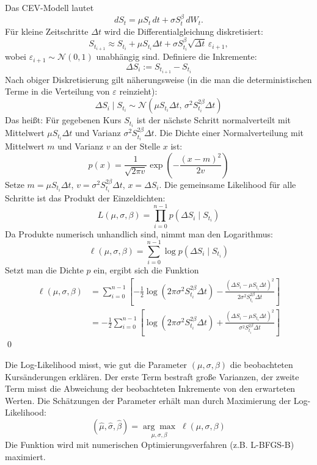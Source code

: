 \begin{satz}
Das CEV-Modell lautet
$$
dS_t = \mu S_t\,dt + \sigma S_t^{\beta}\,dW_t.
$$
Für kleine Zeitschritte $\Delta t$ wird die Differentialgleichung diskretisiert:
$$
S_{t_{i+1}} \approx S_{t_i} + \mu S_{t_i} \Delta t + \sigma S_{t_i}^{\beta} \sqrt{\Delta t}\, \varepsilon_{i+1},
$$
wobei $\varepsilon_{i+1} \sim \mathcal N(0,1)$ unabhängig sind.
Definiere die Inkremente:
$$
\Delta S_i := S_{t_{i+1}} - S_{t_i}
$$
Nach obiger Diskretisierung gilt näherungsweise (in die man die deterministischen Terme in die Verteilung von $\varepsilon$ reinzieht):
$$
\Delta S_i \mid S_{t_i} \sim \mathcal N\left(\mu S_{t_i} \Delta t,\, \sigma^2 S_{t_i}^{2\beta} \Delta t\right)
$$
Das heißt: Für gegebenen Kurs $S_{t_i}$ ist der nächste Schritt normalverteilt mit 
Mittelwert $\mu S_{t_i} \Delta t$ und Varianz $\sigma^2 S_{t_i}^{2\beta} \Delta t$.
Die Dichte einer Normalverteilung mit Mittelwert $m$ und Varianz $v$ an der Stelle $x$ ist:
$$
p(x) = \frac{1}{\sqrt{2\pi v}} \exp\left(-\frac{(x-m)^2}{2v}\right)
$$
Setze $m = \mu S_{t_i} \Delta t$, $v = \sigma^2 S_{t_i}^{2\beta} \Delta t$, $x = \Delta S_i$.
Die gemeinsame Likelihood für alle Schritte ist das Produkt der Einzeldichten:
$$
L(\mu, \sigma, \beta) = \prod_{i=0}^{n-1} p(\Delta S_i \mid S_{t_i})
$$
Da Produkte numerisch unhandlich sind, nimmt man den Logarithmus:
$$
\ell(\mu, \sigma, \beta) = \sum_{i=0}^{n-1} \log p(\Delta S_i \mid S_{t_i})
$$
Setzt man die Dichte $p$ ein, ergibt sich die Funktion
\begin{align*}
\ell(\mu, \sigma, \beta) &= \sum_{i=0}^{n-1} \left[
    -\frac{1}{2} \log(2\pi \sigma^2 S_{t_i}^{2\beta} \Delta t)
    -\frac{(\Delta S_i - \mu S_{t_i} \Delta t)^2}{2 \sigma^2 S_{t_i}^{2\beta} \Delta t}
\right] \\
&= -\frac{1}{2} \sum_{i=0}^{n-1} \left[
    \log(2\pi \sigma^2 S_{t_i}^{2\beta} \Delta t)
    + \frac{(\Delta S_i - \mu S_{t_i} \Delta t)^2}{\sigma^2 S_{t_i}^{2\beta} \Delta t}
\right]
\end{align*} 
\qed
\end{satz}

\begin{bem}[Interpretation]
Die Log-Likelihood misst, wie gut die Parameter $(\mu, \sigma, \beta)$ die beobachteten Kursänderungen erklären. 
Der erste Term bestraft große Varianzen, der zweite Term misst die Abweichung der beobachteten Inkremente von den erwarteten Werten.
Die Schätzungen der Parameter erhält man durch Maximierung der Log-Likelihood:
$$
(\widehat{\mu}, \widehat{\sigma}, \widehat{\beta}) = \underset{\mu, \sigma, \beta}{\arg\max} \; \ell(\mu, \sigma, \beta)
$$
Die Funktion wird mit numerischen Optimierungsverfahren (z.B. L-BFGS-B) maximiert.
\end{bem}

